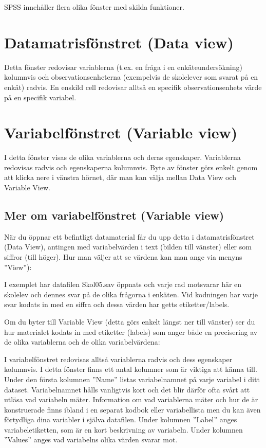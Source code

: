 \documentclass[
]{book}
\begin{document}
SPSS innehåller flera olika fönster med skilda
funktioner.

\hypertarget{datamatrisfuxf6nstret-data-view}{%
\section{Datamatrisfönstret (Data view)}\label{datamatrisfuxf6nstret-data-view}}

Detta fönster redovisar variablerna (t.ex. en
fråga i en enkäteundersökning) kolumnvis
och observationsenheterna (exempelvis de
skolelever som svarat på en enkät) radvis. En
enskild cell redovisar alltså en specifik
observationsenhets värde på en specifik
variabel.

\hypertarget{variabelfuxf6nstret-variable-view}{%
\section{Variabelfönstret (Variable view)}\label{variabelfuxf6nstret-variable-view}}

I detta fönster visas de olika variablerna och
deras egenskaper. Variablerna redovisas
radvis och egenskaperna kolumnvis.
Byte av fönster görs enkelt genom att klicka
nere i vänstra hörnet, där man kan välja
mellan Data View och Variable View.

\hypertarget{mer-om-variabelfuxf6nstret-variable-view}{%
\subsection{Mer om variabelfönstret (Variable view)}\label{mer-om-variabelfuxf6nstret-variable-view}}

När du öppnar ett befintligt datamaterial får du upp detta i datamatrisfönstret (Data View), antingen
med variabelvärden i text (bilden till vänster) eller som siffror (till höger). Hur man väljer att se värdena kan man ange via menyns ''View''):

I exemplet har datafilen Skol05.sav öppnats och varje rad motsvarar här en skolelev och dennes svar på
de olika frågorna i enkäten. Vid kodningen har varje svar kodats in med en siffra och dessa värden har
getts etiketter/labels.

Om du byter till Variable View (detta görs enkelt längst ner till vänster) ser du hur materialet kodats in
med etiketter (labels) som anger både en precisering av de olika variablerna och de olika variabelvärdena:

I variabelfönstret redovisas alltså variablerna radvis och dess egenskaper kolumnvis. I detta fönster
finns ett antal kolumner som är viktiga att känna till. Under den första kolumnen ''Name'' listas
variabelnamnet på varje variabel i ditt dataset. Variabelnamnet hålls vanligtvis kort och det blir därför
ofta svårt att utläsa vad variabeln mäter. Information om vad variablerna mäter och hur de är
konstruerade finns ibland i en separat kodbok eller variabellista men du kan även förtydliga dina
variabler i själva datafilen. Under kolumnen ''Label'' anges variabeletiketten, som är en kort beskrivning
av variabeln. Under kolumnen ''Values'' anges vad variabelns olika värden svarar mot.
\end{document}

